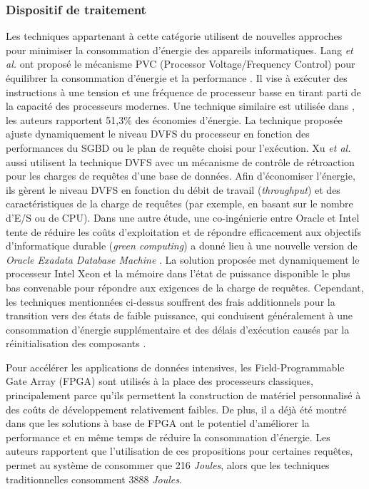 \subsubsection{Dispositif de traitement}
Les techniques appartenant à cette catégorie utilisent de nouvelles approches pour minimiser la consommation d'énergie des appareils informatiques.
Lang \textit{et al.} ont proposé le mécanisme PVC (Processor Voltage/Frequency Control) pour équilibrer la consommation d'énergie et la performance \cite{Lang09}. Il vise à exécuter des instructions à une tension et une fréquence de processeur basse en tirant parti de la capacité des processeurs modernes. Une technique similaire est utilisée dans \cite{Tu14}, les auteurs rapportent 51,3\% des économies d'énergie. La technique proposée ajuste dynamiquement le niveau DVFS du processeur en fonction des performances du SGBD ou le plan de requête choisi pour l'exécution. Xu \textit{et al.} \cite{Xu13b} aussi utilisent la technique DVFS avec un mécanisme de contrôle de rétroaction pour les charges de requêtes d'une base de données. Afin d'économiser l'énergie, ils gèrent le niveau DVFS en fonction du débit de travail (\textit{throughput}) et des caractéristiques de la charge de requêtes (par exemple, en basant sur le nombre d'E/S ou de CPU). Dans une autre étude, une co-ingénierie entre Oracle et Intel tente de réduire les coûts d'exploitation et de répondre efficacement aux objectifs d'informatique durable (\textit{green computing}) a donné lieu à une nouvelle version de \textit{Oracle Exadata Database Machine} \cite{IntelOracle14}. La solution proposée met dynamiquement le processeur Intel Xeon et la mémoire dans l'état de puissance disponible le plus bas convenable pour répondre aux exigences de la charge de requêtes. Cependant, les techniques mentionnées ci-dessus souffrent des frais additionnels pour la transition vers des états de faible puissance, qui conduisent généralement à une consommation d'énergie supplémentaire et des délais d'exécution causés par la réinitialisation des composants \cite{Beloglazov11}.

Pour accélérer les applications de données intensives, les Field-Programmable Gate Array (FPGA) sont utilisés à la place des processeurs classiques, principalement parce qu'ils permettent la construction de matériel personnalisé à des coûts de développement relativement faibles. De plus, il a déjà été montré dans \cite{Woods14} que les solutions à base de FPGA ont le potentiel d'améliorer la performance et en même temps de réduire la consommation d'énergie. Les auteurs rapportent que l'utilisation de ces propositions pour certaines requêtes, permet au système de consommer que 216 \textit{Joules}, alors que les techniques traditionnelles consomment 3888 \textit{Joules}.

